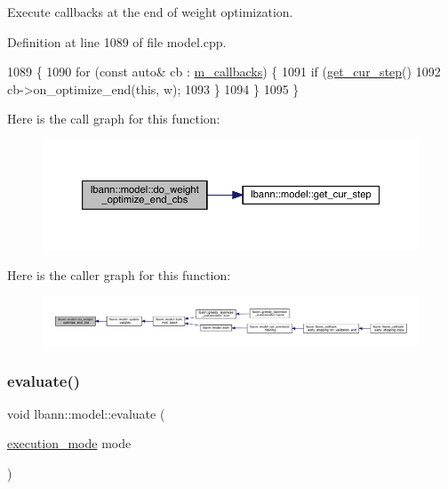 Execute callbacks at the end of weight optimization. 

Definition at line 1089 of file model.\+cpp.


\begin{DoxyCode}
1089                                                  \{
1090   \textcolor{keywordflow}{for} (\textcolor{keyword}{const} \textcolor{keyword}{auto}& cb : \hyperlink{classlbann_1_1model_a07b511fef30368494c2ad80922ffd0eb}{m\_callbacks}) \{
1091     \textcolor{keywordflow}{if} (\hyperlink{classlbann_1_1model_ad0cdcba177434b52dc9c4a97be183a92}{get\_cur\_step}() %
1092       cb->on\_optimize\_end(\textcolor{keyword}{this}, w);
1093     \}
1094   \}
1095 \}
\end{DoxyCode}
Here is the call graph for this function\+:\nopagebreak
\begin{figure}[H]
\begin{center}
\leavevmode
\includegraphics[width=350pt]{classlbann_1_1model_af1e22d2b06d0ca90ae79fd5cf1d82066_cgraph}
\end{center}
\end{figure}
Here is the caller graph for this function\+:\nopagebreak
\begin{figure}[H]
\begin{center}
\leavevmode
\includegraphics[width=350pt]{classlbann_1_1model_af1e22d2b06d0ca90ae79fd5cf1d82066_icgraph}
\end{center}
\end{figure}
\mbox{\label{classlbann_1_1model_a4191097fdbcd1686525e9cd150f958ef}} 
\subsubsection{\texorpdfstring{evaluate()}{evaluate()}}
{\footnotesize\ttfamily void lbann\+::model\+::evaluate (\begin{DoxyParamCaption}\item[{\hyperlink{base_8hpp_a2781a159088df64ed7d47cc91c4dc0a8}{execution\+\_\+mode}}]{mode }\end{DoxyParamCaption})\hspace{0.3cm}{\ttfamily [virtual]}}

